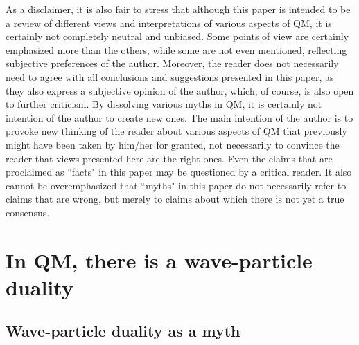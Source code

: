 \documentclass[12pt]{article}
\begin{document}
As a disclaimer, it is also fair to stress that
although this paper is intended to be a review of 
different views and interpretations of various aspects of QM,
it is certainly not completely neutral and unbiased. Some 
points of view are certainly emphasized more than the others,
while some are not even mentioned, 
reflecting subjective preferences of the author.
Moreover, the reader does not necessarily need to agree with
all conclusions and suggestions presented in this paper, as they also 
express a subjective opinion of the author,
which, of course, is also open to further criticism.
By dissolving various myths in QM, it is certainly not intention
of the author to create new ones. 
The main intention of the author
is to provoke new thinking of the reader
about various aspects of QM that previously might have been taken 
by him/her for granted, not necessarily to convince the reader
that views presented here are the right ones.   
Even the claims that are proclaimed as ``facts" in this paper
may be questioned by a critical reader.
It also cannot be overemphasized that ``myths" in this paper
do not necessarily refer to claims that are wrong, but merely
to claims about which there is not yet a true consensus.


\section{In QM, there is a wave-particle duality}

\subsection{Wave-particle duality as a myth}
\end{document}
